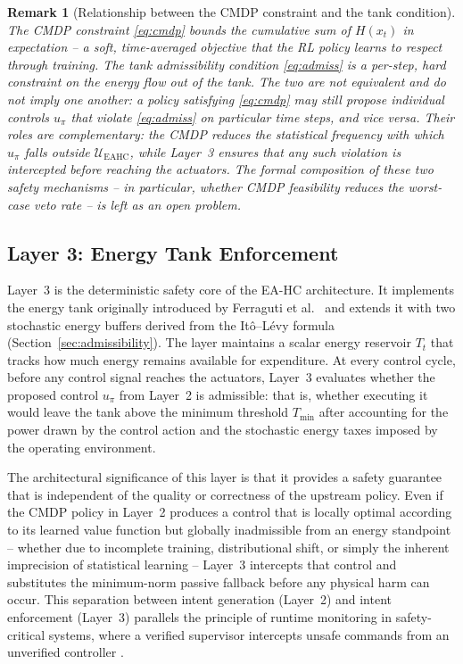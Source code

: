 \documentclass[11pt]{article}
\newtheorem{remark}{Remark}
\begin{document}
\begin{remark}[Relationship between the CMDP constraint and the tank condition]
\label{rem:cmdp-tank}
The CMDP constraint \eqref{eq:cmdp} bounds the cumulative sum of $H(x_t)$ in expectation --
a soft, time-averaged objective that the RL policy learns to respect through training. The tank
admissibility condition \eqref{eq:admiss} is a per-step, hard constraint on the energy flow out
of the tank. The two are not equivalent and do not imply one another: a policy satisfying
\eqref{eq:cmdp} may still propose individual controls $u_\pi$ that violate \eqref{eq:admiss}
on particular time steps, and vice versa. Their roles are complementary: the CMDP reduces the
statistical frequency with which $u_\pi$ falls outside $\mathcal{U}_{\mathrm{EAHC}}$, while
Layer~3 ensures that any such violation is intercepted before reaching the actuators. The
formal composition of these two safety mechanisms -- in particular, whether CMDP feasibility
reduces the worst-case veto rate -- is left as an open problem.
\end{remark}

\subsection{Layer 3: Energy Tank Enforcement}
\label{sec:layer3}

Layer~3 is the deterministic safety core of the EA-HC architecture. It implements the energy
tank originally introduced by Ferraguti et al.\ \cite{ferraguti2013,ferraguti2015,secchi2007}
and extends it with two stochastic energy buffers derived from the It\^{o}--L\'{e}vy formula
(Section~\ref{sec:admissibility}). The layer maintains a scalar energy reservoir $T_t$ that
tracks how much energy remains available for expenditure. At every control cycle, before any
control signal reaches the actuators, Layer~3 evaluates whether the proposed control $u_\pi$
from Layer~2 is admissible: that is, whether executing it would leave the tank above the
minimum threshold $T_{\min}$ after accounting for the power drawn by the control action and
the stochastic energy taxes imposed by the operating environment.

The architectural significance of this layer is that it provides a safety guarantee that is
independent of the quality or correctness of the upstream policy. Even if the CMDP policy in
Layer~2 produces a control that is locally optimal according to its learned value function but
globally inadmissible from an energy standpoint -- whether due to incomplete training,
distributional shift, or simply the inherent imprecision of statistical learning
\cite{garcia2015,achiam2017} -- Layer~3 intercepts that control and substitutes the
minimum-norm passive fallback before any physical harm can occur. This separation between
intent generation (Layer~2) and intent enforcement (Layer~3) parallels the principle of runtime
monitoring in safety-critical systems, where a verified supervisor intercepts unsafe commands
from an unverified controller \cite{pnueli1989,seshia2018}.
\end{document}
